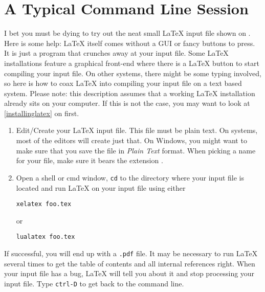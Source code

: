 \section{A Typical Command Line Session}

I bet you must be dying to try out the neat small \LaTeX{} input file shown on
. Here is some help: \LaTeX{} itself comes without a GUI or
fancy buttons to press. It is just a program that crunches away at your input
file. Some \LaTeX{} installations feature a graphical front-end where there is
a \LaTeX{} button to start compiling your input file. On other systems, there
might be some typing involved, so here is how to coax \LaTeX{} into compiling
your input file on a text based system. Please note: this description assumes
that a working \LaTeX{} installation already sits on your computer. If this is
not the case, you may want to look at \autoref{installinglatex} on
 first.

\begin{enumerate}
  \item Edit/Create your \LaTeX{} input file. This file must be plain text.  On
        \Unix{} systems, most of the editors will create just that. On Windows,
        you might want to make sure that you save the file in \emph{Plain Text}
        format. When picking a name for your file, make sure it bears the
        extension .

  \item Open a shell or cmd window, \texttt{cd} to the directory where your
        input file is located and run \LaTeX{} on your input file using either
        \begin{lscommand}
          \verb+xelatex foo.tex+
        \end{lscommand}
        or
        \begin{lscommand}
          \verb+lualatex foo.tex+
        \end{lscommand}
\end{enumerate}

If successful, you will end up with a \texttt{.pdf} file. It may be necessary to
run \LaTeX{} several times to get the table of contents and all internal
references right. When your input file has a bug, \LaTeX{} will tell you about
it and stop processing your input file. Type \texttt{ctrl-D} to get back to the
command line. %

